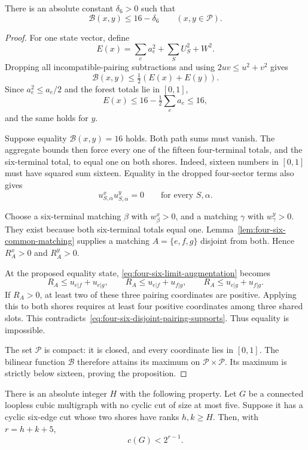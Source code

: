 \begin{proposition}
\label{prop:four-six-bilinear-gap}
There is an absolute constant $\delta_6>0$ such that
\[
 \mathcal B(x,y)\le16-\delta_6
 \qquad(x,y\in\mathcal P).
\]
\end{proposition}

\begin{proof}
For one state vector, define
\[
 E(x)=\sum_ea_e^2+\sum_SU_S^2+W^2.
\]
Dropping all incompatible-pairing subtractions and using $2uv\le u^2+v^2$ gives
\[
 \mathcal B(x,y)\le\tfrac12(E(x)+E(y)).
\]
Since $a_e^2\le a_e/2$ and the forest totals lie in $[0,1]$,
\[
 E(x)\le16-\tfrac12\sum_ea_e\le16,
\]
and the same holds for $y$.

Suppose equality $\mathcal B(x,y)=16$ holds.
Both path sums must vanish.
The aggregate bounds then force every one of the fifteen four-terminal totals, and the six-terminal total, to equal one on both shores.
Indeed, sixteen numbers in $[0,1]$ must have squared sum sixteen.
Equality in the dropped four-sector terms also gives
\begin{equation}\label{eq:four-six-disjoint-pairing-supports}
 u^x_{S,\alpha}u^y_{S,\alpha}=0
 \qquad\text{for every }S,\alpha.
\end{equation}

Choose a six-terminal matching $\beta$ with $w^x_\beta>0$, and a matching $\gamma$ with $w^y_\gamma>0$.
They exist because both six-terminal totals equal one.
Lemma~\ref{lem:four-six-common-matching} supplies a matching $A=\{e,f,g\}$ disjoint from both.
Hence $R^x_A>0$ and $R^y_A>0$.

At the proposed equality state, \eqref{eq:four-six-limit-augmentation} becomes
\[
 R_A\le u_{e|f}+u_{e|g},
 \qquad R_A\le u_{e|f}+u_{f|g},
 \qquad R_A\le u_{e|g}+u_{f|g}.
\]
If $R_A>0$, at least two of these three pairing coordinates are positive.
Applying this to both shores requires at least four positive coordinates among three shared slots.
This contradicts~\eqref{eq:four-six-disjoint-pairing-supports}.
Thus equality is impossible.

The set $\mathcal P$ is compact: it is closed, and every coordinate lies in $[0,1]$.
The bilinear function $\mathcal B$ therefore attains its maximum on $\mathcal P\times\mathcal P$.
Its maximum is strictly below sixteen, proving the proposition.
\end{proof}

\begin{theorem}
\label{thm:four-six-two-large-shores}
There is an absolute integer $H$ with the following property.
Let $G$ be a connected loopless cubic multigraph with no cyclic cut of size at most five.
Suppose it has a cyclic six-edge cut whose two shores have ranks $h,k\ge H$.
Then, with $r=h+k+5$,
\[
 c(G)<2^{r-1}.
\]
\end{theorem}

